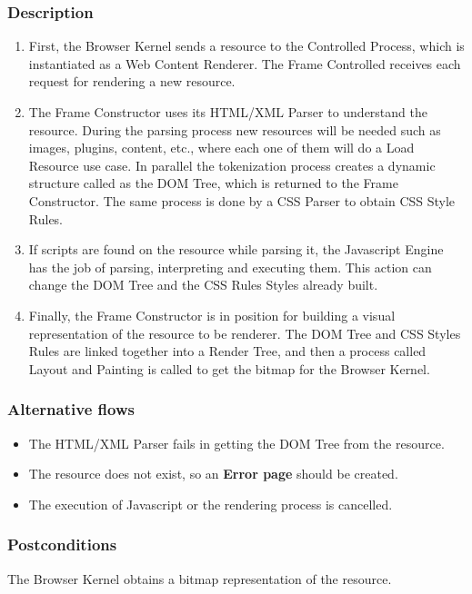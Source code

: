 \documentclass[prodmode,acmtecs]{acmsmall}
\begin{document}
    \subsubsection*{Description}
      \begin{enumerate}
        \item First, the Browser Kernel sends a resource to the Controlled Process, which is instantiated as a Web Content Renderer. The Frame Controlled receives each request for rendering a new resource.
        \item The Frame Constructor uses its HTML/XML Parser to understand the resource. During the parsing process new resources will be needed such as images, plugins, content, etc., where each one of them will do a Load Resource use case. In parallel the tokenization process creates a dynamic structure called as the DOM Tree, which is returned to the Frame Constructor. The same process is done by a CSS Parser to obtain CSS Style Rules.
        \item If scripts are found on the resource while parsing it, the Javascript Engine has the job of parsing, interpreting and executing them. This action can change the DOM Tree and the CSS Rules Styles already built.
        \item Finally, the Frame Constructor is in position for building a visual representation of the resource to be renderer. The DOM Tree and CSS Styles Rules are linked together into a Render Tree, and then a process called Layout and Painting is called to get the bitmap for the Browser Kernel.
      \end{enumerate}

    \subsubsection*{Alternative flows} 
    \begin{itemize}
    \item The HTML/XML Parser fails in getting the DOM Tree from the resource.
    \item The resource does not exist, so an \textbf{Error page} should be created. 
    \item The execution of Javascript or the rendering process is cancelled.
      \end{itemize}
    \subsubsection*{Postconditions} The Browser Kernel obtains a bitmap representation of the resource.
      
\end{document}
